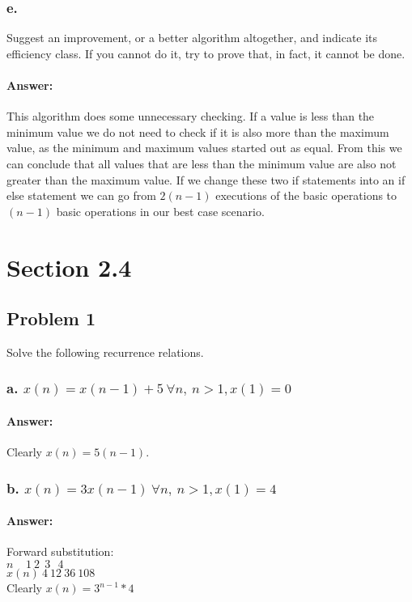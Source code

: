 \documentclass{article}
\begin{document}
    \subsubsection{e.}
    Suggest an improvement, or a better algorithm altogether, and indicate its
      efficiency class. If you cannot do it, try to prove that, in fact, it cannot be
      done.
    \paragraph{Answer:}
    This algorithm does some unnecessary checking. If a value is less than the minimum value we do not need to check if it is also
    more than the maximum value, as the minimum and maximum values started out as equal. From this we can conclude that all values that are less than the minimum value are also not greater than the
    maximum value. If we change these two if statements into an if else statement we can go from $2(n-1)$ executions of the basic operations to $(n-1)$ basic operations in our best case scenario.
\section{Section 2.4}
  \subsection{Problem 1}
    Solve the following recurrence relations.
    \subsubsection{a. $x(n) = x(n-1) + 5 \ \forall{n}, \ n > 1, x(1) = 0$}
      \paragraph{Answer:}
        Clearly $x(n) = 5(n-1)$.
    \subsubsection{b. $x(n) = 3x(n-1) \ \forall{n}, \ n > 1, x(1) = 4$}
      \paragraph{Answer:}
        Forward substitution: \\
          $n  \ \ \ \ \ 1 \ 2 \ \ 3 \ \ \ 4 $\\
          $x(n) \ 4 \ 12 \ 36 \ 108 $\\
        Clearly $x(n) = 3^{n-1} * 4$
\end{document}
